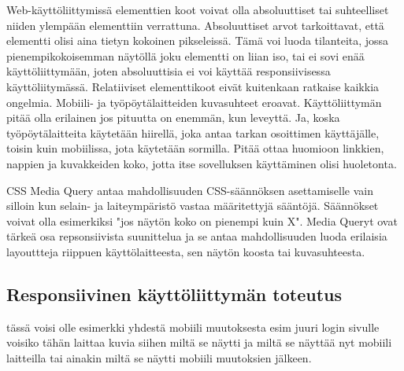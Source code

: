 \documentclass[11pt,a4paper,titlepage,oneside]{article}
\begin{document}
Web-käyttöliittymissä elementtien koot voivat olla absoluuttiset tai suhteelliset niiden ylempään elementtiin verrattuna. Absoluuttiset arvot tarkoittavat, että elementti olisi aina tietyn kokoinen pikseleissä. 
Tämä voi luoda tilanteita, jossa pienempikokoisemman näytöllä joku elementti on liian iso, tai ei sovi enää käyttöliittymään, joten absoluuttisia ei voi käyttää responsiivisessa käyttöliitymässä.
Relatiiviset elementtikoot eivät kuitenkaan ratkaise kaikkia ongelmia. Mobiili- ja työpöytälaitteiden kuvasuhteet eroavat. Käyttöliittymän pitää olla erilainen jos pituutta on enemmän, kun leveyttä. 
Ja, koska työpöytälaitteita käytetään hiirellä, joka antaa tarkan osoittimen käyttäjälle, toisin kuin mobiilissa, jota käytetään sormilla. 
Pitää ottaa huomioon linkkien, nappien ja kuvakkeiden koko, jotta itse sovelluksen käyttäminen olisi huoletonta.\medskip

CSS Media Query antaa mahdollisuuden CSS-säännöksen asettamiselle vain silloin kun selain- ja laiteympäristö vastaa määritettyjä sääntöjä. 
Säännökset voivat olla esimerkiksi "jos näytön koko on pienempi kuin X".
Media Queryt ovat tärkeä osa repsonsiivista suunittelua ja se antaa mahdollisuuden luoda erilaisia layouttteja riippuen käyttölaitteesta, sen näytön koosta tai kuvasuhteesta.
\medskip










\iffalse

\subsection*{Responsiivinen käyttöliittymän toteutus}



tässä voisi olle esimerkki yhdestä mobiili muutoksesta esim juuri login sivulle
voisiko tähän laittaa kuvia siihen miltä se näytti ja miltä se näyttää nyt mobiili laitteilla
tai ainakin miltä se näytti mobiili muutoksien jälkeen. 
\end{document}
